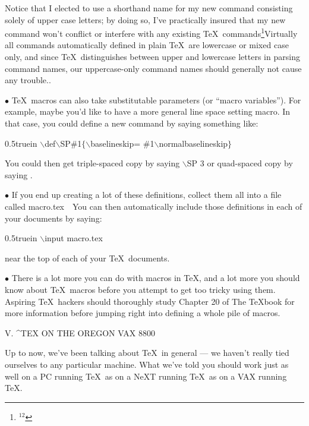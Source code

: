 \bigskip\par\noindent
Notice that I elected to use a shorthand name for my new command consisting
solely of upper case letters; by doing so, I've practically insured
that my new command won't conflict or interfere with any existing \TeX\ 
commands\footnote{$^{12}$}{Virtually all commands automatically
defined in plain \TeX\ are lowercase or mixed case only, and since \TeX\ 
distinguishes between upper and lowercase letters in parsing command names,
our uppercase-only command names should generally not cause any trouble.}.  
\bigskip\par\noindent
$\bullet$
\TeX\ macros can also take substitutable parameters (or ``macro variables'').
For example, maybe you'd like to have a more general line space setting
macro. In that case, you could define a new command by saying something like:
\bigskip\par\noindent\hglue 0.5truein
{\twltt $\backslash$def$\backslash$SP\#1$\{${}$\backslash$baselineskip=%
\#1$\backslash$normalbaselineskip$\}$}
\bigskip\par\noindent
You could then get triple-spaced copy by saying {\twltt $\backslash$SP 3}
or quad-spaced copy by saying .
\bigskip\par\noindent
$\bullet$ 
If you end up creating a lot of these definitions, collect them all into a
file called {\twltt macro.tex}\ \ You can then automatically include those
definitions in each of your documents by saying:
\bigskip\par\noindent\hglue 0.5truein
{\twltt $\backslash$input macro.tex}
\bigskip\par\noindent
near the top of each of your \TeX\ documents.
\bigskip\par\noindent
$\bullet$ There is a {\twlit lot} more you can do with macros in \TeX{}, 
and a lot more you should {\twlit know}
about \TeX\ macros before you attempt to get too
tricky using them. Aspiring \TeX\ hackers should thoroughly study Chapter
20 of {\twlit The \TeX{}book} for more information before jumping right into
defining a whole pile of macros.
\vfill\eject
\centerline{\twlbf V. ^{TEX ON THE OREGON VAX 8800}}
\bigskip\par\noindent
Up to now, we've been talking about \TeX\ in general --- we
haven't really tied ourselves to any particular machine. What we've told you
should work just as well on a PC running \TeX\ as on a NeXT running \TeX\ as 
on a VAX running \TeX{}.
